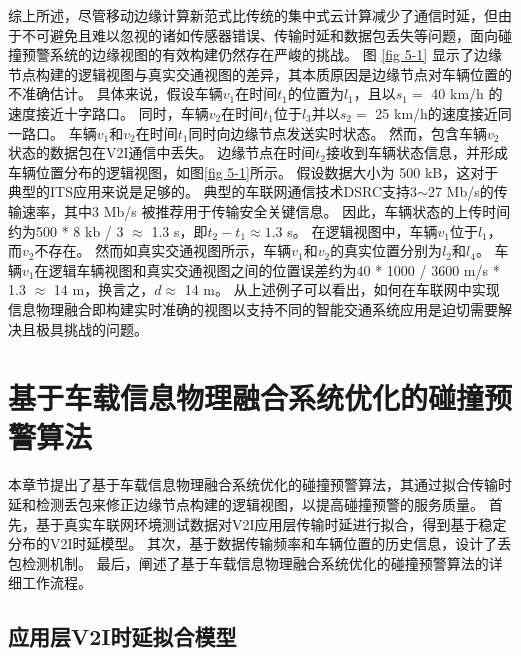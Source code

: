 综上所述，尽管移动边缘计算新范式比传统的集中式云计算减少了通信时延，但由于不可避免且难以忽视的诸如传感器错误、传输时延和数据包丢失等问题，面向碰撞预警系统的边缘视图的有效构建仍然存在严峻的挑战。
图 \ref{fig 5-1} 显示了边缘节点构建的逻辑视图与真实交通视图的差异，其本质原因是边缘节点对车辆位置的不准确估计。
具体来说，假设车辆$v_1$在时间$t_1$的位置为$l_1$，且以$s_1 =$ 40 km/h 的速度接近十字路口。
同时，车辆$v_2$在时间$t_1$位于$l_3$并以$s_2=$ 25 km/h的速度接近同一路口。
车辆$v_1$和$v_2$在时间$t_1$同时向边缘节点发送实时状态。
然而，包含车辆$v_2$状态的数据包在V2I通信中丢失。
边缘节点在时间$t_2$接收到车辆状态信息，并形成车辆位置分布的逻辑视图，如图\ref{fig 5-1}所示。
假设数据大小为 500 kB，这对于典型的ITS应用来说是足够的\cite{liu2013improving}。
典型的车联网通信技术DSRC支持3$\sim$27 Mb/s的传输速率，其中3 Mb/s 被推荐用于传输安全关键信息\cite{kenney2011dedicated}。
因此，车辆状态的上传时间约为500 * 8 kb / 3 $\approx$ 1.3 s，即${t_2} - {t_1} \approx 1.3$ s。
在逻辑视图中，车辆$v_1$位于$l_1$，而$v_2$不存在。
然而如真实交通视图所示，车辆$v_1$和$v_2$的真实位置分别为$l_2$和$l_4$。
车辆$v_1$在逻辑车辆视图和真实交通视图之间的位置误差约为40 * 1000 / 3600 m/s * 1.3 $\approx$ 14 m，换言之，$d \approx$ 14 m。
从上述例子可以看出，如何在车联网中实现信息物理融合即构建实时准确的视图以支持不同的智能交通系统应用是迫切需要解决且极具挑战的问题。

\section{基于车载信息物理融合系统优化的碰撞预警算法}\label{section 5-3}

本章节提出了基于车载信息物理融合系统优化的碰撞预警算法，其通过拟合传输时延和检测丢包来修正边缘节点构建的逻辑视图，以提高碰撞预警的服务质量。
首先，基于真实车联网环境测试数据对V2I应用层传输时延进行拟合，得到基于稳定分布的V2I时延模型。
其次，基于数据传输频率和车辆位置的历史信息，设计了丢包检测机制。
最后，阐述了基于车载信息物理融合系统优化的碰撞预警算法的详细工作流程。

\subsection{应用层V2I时延拟合模型}

